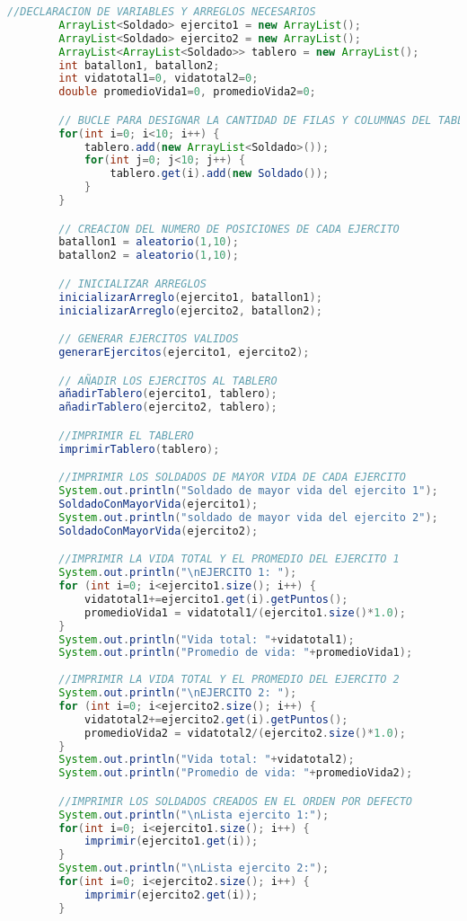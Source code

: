 \documentclass{article}
\begin{document}
\begin{itemize}
\begin{lstlisting}[language=java]
		//DECLARACION DE VARIABLES Y ARREGLOS NECESARIOS
		ArrayList<Soldado> ejercito1 = new ArrayList();
		ArrayList<Soldado> ejercito2 = new ArrayList();
		ArrayList<ArrayList<Soldado>> tablero = new ArrayList();
		int batallon1, batallon2;
		int vidatotal1=0, vidatotal2=0;
		double promedioVida1=0, promedioVida2=0;

		// BUCLE PARA DESIGNAR LA CANTIDAD DE FILAS Y COLUMNAS DEL TABLERO
		for(int i=0; i<10; i++) {
			tablero.add(new ArrayList<Soldado>());
			for(int j=0; j<10; j++) {
				tablero.get(i).add(new Soldado());
			}
		}

		// CREACION DEL NUMERO DE POSICIONES DE CADA EJERCITO
		batallon1 = aleatorio(1,10);
		batallon2 = aleatorio(1,10);

		// INICIALIZAR ARREGLOS
		inicializarArreglo(ejercito1, batallon1);
		inicializarArreglo(ejercito2, batallon2);

		// GENERAR EJERCITOS VALIDOS
		generarEjercitos(ejercito1, ejercito2);

		// AÑADIR LOS EJERCITOS AL TABLERO
		añadirTablero(ejercito1, tablero);
		añadirTablero(ejercito2, tablero);

		//IMPRIMIR EL TABLERO
		imprimirTablero(tablero);

		//IMPRIMIR LOS SOLDADOS DE MAYOR VIDA DE CADA EJERCITO
		System.out.println("Soldado de mayor vida del ejercito 1");
		SoldadoConMayorVida(ejercito1);
		System.out.println("soldado de mayor vida del ejercito 2");
		SoldadoConMayorVida(ejercito2);

		//IMPRIMIR LA VIDA TOTAL Y EL PROMEDIO DEL EJERCITO 1
		System.out.println("\nEJERCITO 1: ");
		for (int i=0; i<ejercito1.size(); i++) {
			vidatotal1+=ejercito1.get(i).getPuntos();
			promedioVida1 = vidatotal1/(ejercito1.size()*1.0);
		}
		System.out.println("Vida total: "+vidatotal1);
		System.out.println("Promedio de vida: "+promedioVida1);
		
		//IMPRIMIR LA VIDA TOTAL Y EL PROMEDIO DEL EJERCITO 2
		System.out.println("\nEJERCITO 2: ");
		for (int i=0; i<ejercito2.size(); i++) {
			vidatotal2+=ejercito2.get(i).getPuntos();
			promedioVida2 = vidatotal2/(ejercito2.size()*1.0);
		}
		System.out.println("Vida total: "+vidatotal2);
		System.out.println("Promedio de vida: "+promedioVida2);

		//IMPRIMIR LOS SOLDADOS CREADOS EN EL ORDEN POR DEFECTO
		System.out.println("\nLista ejercito 1:");
		for(int i=0; i<ejercito1.size(); i++) {
			imprimir(ejercito1.get(i));
		}
		System.out.println("\nLista ejercito 2:");
		for(int i=0; i<ejercito2.size(); i++) {
			imprimir(ejercito2.get(i));
		}


\end{lstlisting}
\end{itemize}
\end{document}
